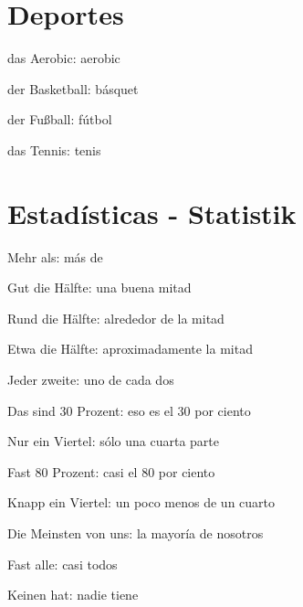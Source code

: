 \section{Deportes}
\begin{multicols}{3}
\begin{myitemize}
\item das Aerobic: aerobic
\item der Basketball: básquet
\item der Fußball: fútbol
\item das Tennis: tenis
\end{myitemize}
\end{multicols}

\section{Estadísticas - Statistik}
\begin{myitemize}
\item Mehr als: más de
\item Gut die Hälfte: una buena mitad
\item Rund die Hälfte: alrededor de la mitad
\item Etwa die Hälfte: aproximadamente la mitad
\item Jeder zweite: uno de cada dos
\item Das sind 30 Prozent: eso es el 30 por ciento
\item Nur ein Viertel: sólo una cuarta parte
\item Fast 80 Prozent: casi el 80 por ciento
\item Knapp ein Viertel: un poco menos de un cuarto
\item Die Meinsten von uns: la mayoría de nosotros
\item Fast alle: casi todos
\item Keinen hat: nadie tiene
\end{myitemize}

